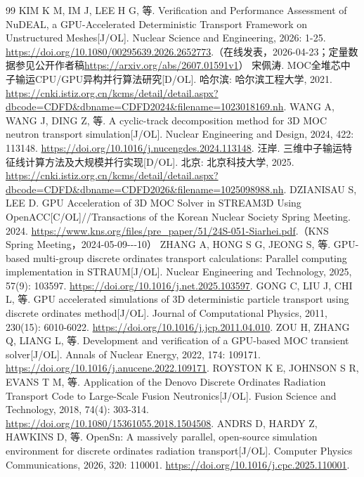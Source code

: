\documentclass[UTF8, zihao=-4, fontset=none, a4paper]{ctexart}
\begin{document}
\begin{thebibliography}{99}
 KIM K M, IM J, LEE H G, 等. Verification and Performance Assessment of NuDEAL, a GPU-Accelerated Deterministic Transport Framework on Unstructured Meshes{[}J/OL{]}. Nuclear Science and Engineering, 2026: 1-25. \url{https://doi.org/10.1080/00295639.2026.2652773}.（在线发表，2026-04-23；定量数据参见公开作者稿\url{https://arxiv.org/abs/2607.01591v1}）
 宋佩涛. MOC全堆芯中子输运CPU/GPU异构并行算法研究{[}D/OL{]}. 哈尔滨: 哈尔滨工程大学, 2021. \url{https://cnki.istiz.org.cn/kcms/detail/detail.aspx?dbcode=CDFD&dbname=CDFD2024&filename=1023018169.nh}.
 WANG A, WANG J, DING Z, 等. A cyclic-track decomposition method for 3D MOC neutron transport simulation{[}J/OL{]}. Nuclear Engineering and Design, 2024, 422: 113148. \url{https://doi.org/10.1016/j.nucengdes.2024.113148}.
 汪岸. 三维中子输运特征线计算方法及大规模并行实现{[}D/OL{]}. 北京: 北京科技大学, 2025. \url{https://cnki.istiz.org.cn/kcms/detail/detail.aspx?dbcode=CDFD&dbname=CDFD2026&filename=1025098988.nh}.
 DZIANISAU S, LEE D. GPU Acceleration of 3D MOC Solver in STREAM3D Using OpenACC{[}C/OL{]}//Transactions of the Korean Nuclear Society Spring Meeting. 2024. \url{https://www.kns.org/files/pre_paper/51/24S-051-Siarhei.pdf}.（KNS Spring Meeting，2024-05-09-\/-\/-10）
 ZHANG A, HONG S G, JEONG S, 等. GPU-based multi-group discrete ordinates transport calculations: Parallel computing implementation in STRAUM{[}J/OL{]}. Nuclear Engineering and Technology, 2025, 57(9): 103597. \url{https://doi.org/10.1016/j.net.2025.103597}.
 GONG C, LIU J, CHI L, 等. GPU accelerated simulations of 3D deterministic particle transport using discrete ordinates method{[}J/OL{]}. Journal of Computational Physics, 2011, 230(15): 6010-6022. \url{https://doi.org/10.1016/j.jcp.2011.04.010}.
 ZOU H, ZHANG Q, LIANG L, 等. Development and verification of a GPU-based MOC transient solver{[}J/OL{]}. Annals of Nuclear Energy, 2022, 174: 109171. \url{https://doi.org/10.1016/j.anucene.2022.109171}.
 ROYSTON K E, JOHNSON S R, EVANS T M, 等. Application of the Denovo Discrete Ordinates Radiation Transport Code to Large-Scale Fusion Neutronics{[}J/OL{]}. Fusion Science and Technology, 2018, 74(4): 303-314. \url{https://doi.org/10.1080/15361055.2018.1504508}.
 ANDRS D, HARDY Z, HAWKINS D, 等. OpenSn: A massively parallel, open-source simulation environment for discrete ordinates radiation transport{[}J/OL{]}. Computer Physics Communications, 2026, 320: 110001. \url{https://doi.org/10.1016/j.cpc.2025.110001}.

\end{thebibliography}
\end{document}

